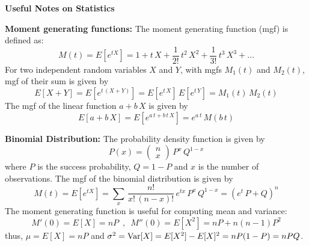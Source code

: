 \documentclass[aps,prl,preprint,superscriptaddress]{revtex4-1}
\begin{document}
\begin{center}
{\bf Useful Notes on Statistics}
\end{center}

{\bf Moment generating functions:} The moment generating function (mgf) is defined as:
%
\begin{equation}
M(t) = E[e^{t X}] = 1 + t\,X + \frac{1}{2!}\, t^2\, X^2 + \frac{1}{3!}\, t^3\, X^3 + \dots
\end{equation}
%
For two independent random variables $X$ and $Y$, with mgfs $M_1(t)$ and $M_2(t)$, mgf of their 
sum is given by
%
\begin{equation}
E[X+Y] = E[e^{t\, (X+Y)}] = E[e^{t\, X}] \, E[e^{t\, Y}] = M_1(t) \, M_2(t)
\end{equation}
%
The mgf of the linear function $a + b\, X$ is given by
%
\begin{equation}
E[a + b\, X] = E[e^{a\,t + b\,t\, X}] = e^{a\,t} \, M(b\,t)
\end{equation}
%

{\bf Binomial Distribution:} The probability density function is given by
%
\begin{equation}
P(x) = \left(\begin{array}{c} n \\ x \end{array} \right)\, P^x\, Q^{1-x}
\end{equation}
%
where $P$ is the success probability, $Q=1-P$ and $x$ is the number of observations. The mgf of the binomial
distribution is given by
%
\begin{equation}
M(t) = E[e^{t X}] = \sum_{x}\, \frac{n !}{x ! \, (n-x) !}\, e^{tx}\, P^x\, Q^{1-x} = 
     (e^t\, P + Q)^n
\end{equation}
%
The moment generating function is useful for computing mean and variance:
%
\begin{equation}
M'(0) = E[X] = nP \,\,\, , \,\,\, M''(0) = E[X^2] = nP + n(n-1) P^2
\end{equation}
%
thus, $\mu = E[X] = nP$ and $\sigma^2 = {\rm Var}[X] = E[X^2] - E[X]^2 = nP (1-P) = nPQ$.

\vspace{0.5cm}
\end{document}
